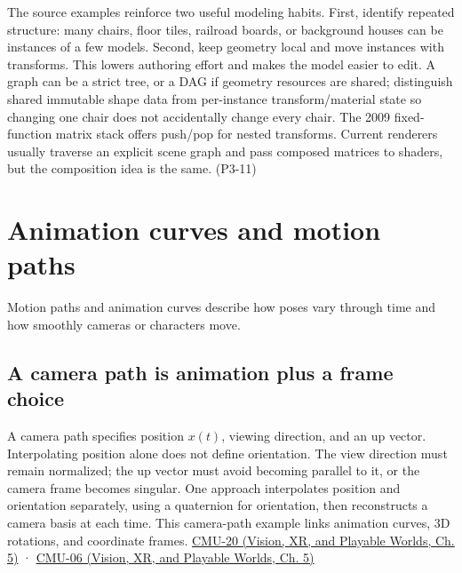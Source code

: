 The source examples reinforce two useful modeling habits. First, identify repeated structure: many chairs, floor tiles, railroad boards, or background houses can be instances of a few models. Second, keep geometry local and move instances with transforms. This lowers authoring effort and makes the model easier to edit. A graph can be a strict tree, or a DAG if geometry resources are shared; distinguish shared immutable shape data from per-instance transform/material state so changing one chair does not accidentally change every chair. The 2009 fixed-function matrix stack offers push/pop for nested transforms. Current renderers usually traverse an explicit scene graph and pass composed matrices to shaders, but the composition idea is the same. (P3-11)

\section{Animation curves and motion paths}\label{04-visual-computing-ii-ch029-animation-curves-and-motion-paths}

\hypertarget{04-visual-computing-ii-ch029-animation-curves-and-motion-paths}{}

Motion paths and animation curves describe how poses vary through time and how smoothly cameras or characters move.

\subsection{A camera path is animation plus a frame choice}\label{04-visual-computing-ii-ch029-a-camera-path-is-animation-plus-a-frame-choice}

\hypertarget{04-visual-computing-ii-ch029-a-camera-path-is-animation-plus-a-frame-choice}{}

A camera path specifies position \(x(t)\), viewing direction, and an up vector. Interpolating position alone does not define orientation. The view direction must remain normalized; the up vector must avoid becoming parallel to it, or the camera frame becomes singular. One approach interpolates position and orientation separately, using a quaternion for orientation, then reconstructs a camera basis at each time. This camera-path example links animation curves, 3D rotations, and coordinate frames. \href{../07-Vision-XR-and-Playable-Worlds/main.pdf\#nameddest=04-visual-computing-ii-ch036-cmu-20---introduction-to-animation}{CMU-20 (Vision, XR, and Playable Worlds, Ch. 5)} · \href{../07-Vision-XR-and-Playable-Worlds/main.pdf\#nameddest=04-visual-computing-ii-ch036-cmu-06---3d-rotations-and-complex-representations}{CMU-06 (Vision, XR, and Playable Worlds, Ch. 5)}


